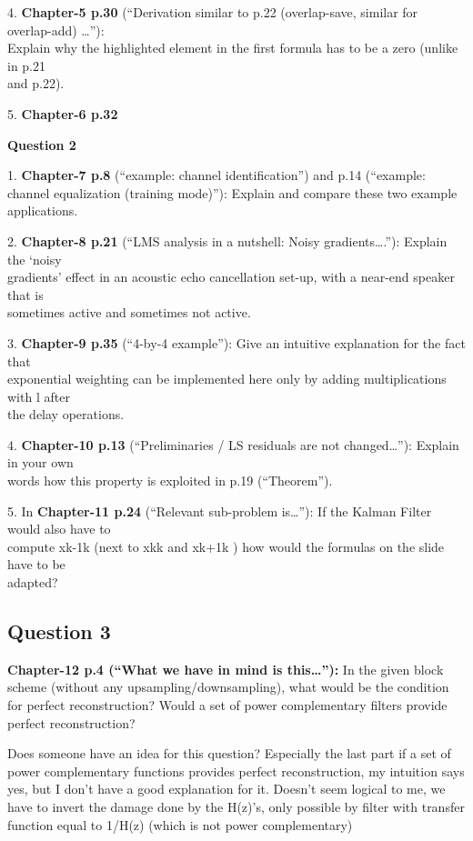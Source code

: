 \documentclass[
  a4paper,
  ,captions=tableheading
]{scrartcl}
\begin{document}
4. \textbf{Chapter-5 p.30} (``Derivation similar to p.22 (overlap-save,
similar for overlap-add) \ldots''):\\
Explain why the highlighted element in the first formula has to be a
zero (unlike in p.21\\
and p.22).

5. \textbf{Chapter-6 p.32}

\textbf{Question 2}

1. \textbf{Chapter-7 p.8} (``example: channel identification'') and p.14
(``example: channel equalization (training mode)''): Explain and compare
these two example applications.

2. \textbf{Chapter-8 p.21} (``LMS analysis in a nutshell: Noisy
gradients\ldots.''): Explain the `noisy\\
gradients' effect in an acoustic echo cancellation set-up, with a
near-end speaker that is\\
sometimes active and sometimes not active.

3. \textbf{Chapter-9 p.35} (``4-by-4 example''): Give an intuitive
explanation for the fact that\\
exponential weighting can be implemented here only by adding
multiplications with l after\\
the delay operations.

4. \textbf{Chapter-10 p.13} (``Preliminaries / LS residuals are not
changed\ldots{}''): Explain in your own\\
words how this property is exploited in p.19 (``Theorem'').

5. In \textbf{Chapter-11 p.24} (``Relevant sub-problem is\ldots''): If
the Kalman Filter would also have to\\
compute xk-1\textbar k (next to xk\textbar k and xk+1\textbar k ) how
would the formulas on the slide have to be\\
adapted?

\subsection{\texorpdfstring{\textbf{Question
3}}{Question 3}}\label{question-3}

\textbf{Chapter-12 p.4 (``What we have in mind is this\ldots''):} In the
given block scheme (without any upsampling/downsampling), what would be
the condition for perfect reconstruction? Would a set of power
complementary filters provide perfect reconstruction?

Does someone have an idea for this question? Especially the last part if
a set of power complementary functions provides perfect reconstruction,
my intuition says yes, but I don't have a good explanation for it.
Doesn't seem logical to me, we have to invert the damage done by the
H(z)'s, only possible by filter with transfer function equal to 1/H(z)
(which is not power complementary)
\end{document}
